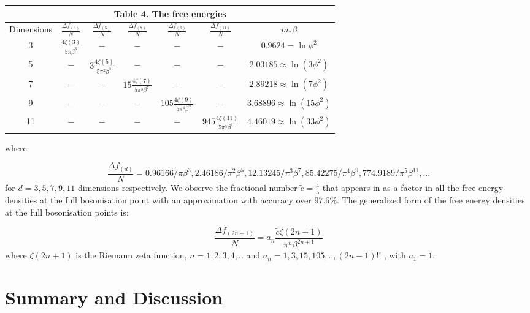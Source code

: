 \documentclass[twoside]{article}
\begin{document}
{\centering
	\begin{tabular}{|c|c|c|c|c|c|c|}
		\hline 
		\multicolumn{7}{|c|}{\textbf{Table 4. The free energies}} \\ 
		\hline 
		Dimensions & $\frac{\Delta f_{(3)}}{N}$ & $\frac{\Delta f_{(5)}}{N}$ & $\frac{\Delta f_{(7)}}{N}$ & $\frac{\Delta f_{(9)}}{N}$ & $\frac{\Delta f_{(11)}}{N}$ & $m_*\beta$ \\ 
		\hline 
		3 & $\frac{4 \zeta(3)}{5\pi\beta^3}$ & $-$ & $-$ & $-$ & $-$ & $0.9624=\ln\phi^2$ \\ 
		\hline 
		5 & $-$ & $3\frac{4\zeta(5)}{5\pi^2\beta^5}$ & $-$ & $-$ & $-$ & $2.03185\approx\ln(3\phi^2)$ \\ 
		\hline 
		7 & $-$ & $-$ & $15\frac{4\zeta(7)}{5\pi^3\beta^7}$ & $-$ & $-$ & $2.89218\approx\ln(7\phi^2)$ \\ 
		\hline
		9 & $-$ & $-$ & $-$ & $105\frac{4\zeta(9)}{5\pi^4\beta^9}$ & $-$ & $3.68896\approx\ln(15\phi^2)$ \\ 
		\hline 
		11 & $-$ & $-$ & $-$ & $-$ & $945\frac{4\zeta(11)}{5\pi^5\beta^{11}}$ & $4.46019\approx\ln(33\phi^2)$\\
		\hline 
	\end{tabular}\par}
where 

\begin{equation}
\frac{\Delta f_{(d)}}{N}=0.96166/\pi\beta^3, 2.46186/\pi^2\beta^5, 12.13245/\pi^3\beta^7, 85.42275/\pi^4\beta^9, 774.9189/\pi^5\beta^{11}, ...
\end{equation}
for $d=3,5,7,9,11$ dimensions respectively. We observe the fractional number $\tilde{c}=\frac{4}{5}$ that appears in \cite{Sachdev:1993pr} as a factor in all the free energy densities at the full bosonisation point with an approximation with accuracy over $97.6\%$. The generalized form of the free energy densities at the full bosonisation points is:

\begin{equation}
\label{freeenergy}
\frac{\Delta f_{(2n+1)}}{N}=a_n\frac{\tilde{c}\zeta(2n+1)}{\pi^n\beta^{2n+1}}
\end{equation}
where $\zeta(2n+1)$ is the Riemann zeta function, $n=1,2,3,4,..$ and $a_n=1,3,15,105,..,(2n-1)!!$ , with $a_1=1$.

\section{Summary and Discussion}
\end{document}
